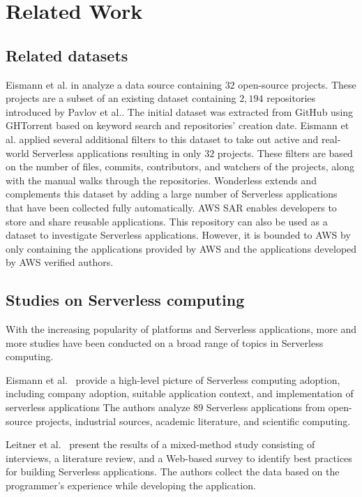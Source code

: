 
\section{Related Work}
\label{relatedwork}

\subsection{Related datasets}
Eismann et al. in \cite{eismann2020serverless} analyze a data source 
containing $32$ open-source projects. These projects are a subset of 
an existing dataset containing $2,194$ repositories introduced by 
Pavlov et al.\cite{pavlov2019serverless}. The initial dataset was extracted 
from GitHub using GHTorrent based on keyword search and repositories' 
creation date. Eismann et al. applied several additional filters to this dataset 
to take out active and real-world Serverless applications resulting in only $32$
projects. These filters are based on the number of files, commits, 
contributors, and watchers of the projects, along with the manual walks 
through the repositories. Wonderless extends and complements 
this dataset by adding a large number of Serverless applications that 
have been collected fully automatically.
AWS SAR enables developers to store and share reusable applications. 
This repository can also be used as a dataset to investigate Serverless 
applications. However, it is bounded to AWS by only containing the 
applications provided by AWS and the applications developed by 
AWS verified authors.


\subsection{Studies on Serverless computing}

With the increasing popularity of \faas platforms and Serverless applications, 
more and more studies have been conducted on a broad range of topics in 
Serverless computing. 

Eismann et al.~\cite{eismann2020serverless} provide a  
high-level picture of Serverless computing adoption, including 
company adoption, suitable application context, and implementation 
of serverless applications
The authors analyze 89 Serverless applications from open-source projects, 
industrial sources, academic literature, and scientific computing. 


Leitner et al.~\cite{leitner2019mixed} present the results of a mixed-method 
study consisting of interviews, a literature review, and a Web-based survey 
to identify best practices for building Serverless applications. 
The authors collect the data based on the programmer's experience while 
developing the application. 

